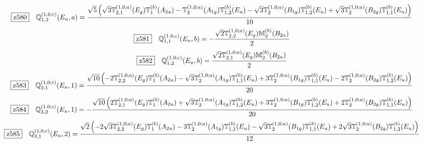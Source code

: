 \documentclass[fleqn,10pt,landscape]{jsarticle}
\begin{document}
\begin{dmath*}
\hspace*{3mm}\fbox{z580}\quad \mathbb{Q}_{1,2}^{(1,0;c)}(E_{u},a)=\frac{\sqrt{5} \left(\sqrt{3} \mathbb{T}_{2,1}^{(1,0;a)}(E_{g}) \mathbb{T}_{1}^{(b)}(A_{2u}) - \mathbb{T}_{2}^{(1,0;a)}(A_{1g}) \mathbb{T}_{1,2}^{(b)}(E_{u}) - \sqrt{3} \mathbb{T}_{2}^{(1,0;a)}(B_{1g}) \mathbb{T}_{1,2}^{(b)}(E_{u}) + \sqrt{3} \mathbb{T}_{2}^{(1,0;a)}(B_{2g}) \mathbb{T}_{1,1}^{(b)}(E_{u})\right)}{10}
\end{dmath*}
\begin{dmath*}
\hspace*{3mm}\fbox{z581}\quad \mathbb{Q}_{1,1}^{(1,0;c)}(E_{u},b)=- \frac{\sqrt{2} \mathbb{T}_{2,2}^{(1,0;a)}(E_{g}) \mathbb{M}_{2}^{(b)}(B_{2u})}{2}
\end{dmath*}
\begin{dmath*}
\hspace*{3mm}\fbox{z582}\quad \mathbb{Q}_{1,2}^{(1,0;c)}(E_{u},b)=\frac{\sqrt{2} \mathbb{T}_{2,1}^{(1,0;a)}(E_{g}) \mathbb{M}_{2}^{(b)}(B_{2u})}{2}
\end{dmath*}
\begin{dmath*}
\hspace*{3mm}\fbox{z583}\quad \mathbb{Q}_{3,1}^{(1,0;c)}(E_{u},1)=\frac{\sqrt{10} \left(- 2 \mathbb{T}_{2,2}^{(1,0;a)}(E_{g}) \mathbb{T}_{1}^{(b)}(A_{2u}) - \sqrt{3} \mathbb{T}_{2}^{(1,0;a)}(A_{1g}) \mathbb{T}_{1,1}^{(b)}(E_{u}) + 3 \mathbb{T}_{2}^{(1,0;a)}(B_{1g}) \mathbb{T}_{1,1}^{(b)}(E_{u}) - 2 \mathbb{T}_{2}^{(1,0;a)}(B_{2g}) \mathbb{T}_{1,2}^{(b)}(E_{u})\right)}{20}
\end{dmath*}
\begin{dmath*}
\hspace*{3mm}\fbox{z584}\quad \mathbb{Q}_{3,2}^{(1,0;c)}(E_{u},1)=- \frac{\sqrt{10} \left(2 \mathbb{T}_{2,1}^{(1,0;a)}(E_{g}) \mathbb{T}_{1}^{(b)}(A_{2u}) + \sqrt{3} \mathbb{T}_{2}^{(1,0;a)}(A_{1g}) \mathbb{T}_{1,2}^{(b)}(E_{u}) + 3 \mathbb{T}_{2}^{(1,0;a)}(B_{1g}) \mathbb{T}_{1,2}^{(b)}(E_{u}) + 2 \mathbb{T}_{2}^{(1,0;a)}(B_{2g}) \mathbb{T}_{1,1}^{(b)}(E_{u})\right)}{20}
\end{dmath*}
\begin{dmath*}
\hspace*{3mm}\fbox{z585}\quad \mathbb{Q}_{3,1}^{(1,0;c)}(E_{u},2)=\frac{\sqrt{2} \left(- 2 \sqrt{3} \mathbb{T}_{2,2}^{(1,0;a)}(E_{g}) \mathbb{T}_{1}^{(b)}(A_{2u}) - 3 \mathbb{T}_{2}^{(1,0;a)}(A_{1g}) \mathbb{T}_{1,1}^{(b)}(E_{u}) - \sqrt{3} \mathbb{T}_{2}^{(1,0;a)}(B_{1g}) \mathbb{T}_{1,1}^{(b)}(E_{u}) + 2 \sqrt{3} \mathbb{T}_{2}^{(1,0;a)}(B_{2g}) \mathbb{T}_{1,2}^{(b)}(E_{u})\right)}{12}
\end{dmath*}
\end{document}

